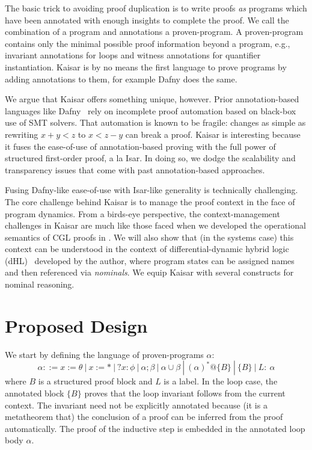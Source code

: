 \documentclass[12pt]{cmuthesis}
\theoremstyle{definition}
\theoremstyle{remark}
\newcommand{\rref}[2][]{\prettyref{#2}}
\newcommand{\dHL}{\textsf{dHL}\xspace}
\newcommand{\CGL}{\textsf{CGL}\xspace}
\begin{document}
The basic trick to avoiding proof duplication is to write proofs \emph{as} programs which have been annotated with enough insights to complete the proof.
We call the combination of a program and annotations a proven-program.
A proven-program contains only the minimal possible proof information beyond a program, e.g., invariant annotations for loops and witness annotations for quantifier instantiation.
Kaisar is by no means the first language to prove programs by adding annotations to them, for example Dafny does the same.

We argue that Kaisar offers something unique, however.
Prior annotation-based languages like Dafny~\cite{DBLP:conf/lpar/Leino10} rely on incomplete proof automation based on black-box use of SMT solvers.
That automation is known to be fragile: changes as simple as rewriting $x + y < z$ to $x < z - y$ can break a proof.
Kaisar is interesting because it fuses the ease-of-use of annotation-based proving with the full power of structured first-order proof, a la Isar.
In doing so, we dodge the scalability and transparency issues that come with past annotation-based approaches.

Fusing Dafny-like ease-of-use with Isar-like generality is technically challenging.
The core challenge behind Kaisar is to manage the proof context in the face of program dynamics.
From a birds-eye perspective, the context-management challenges in Kaisar are much like those faced when we developed the operational semantics of \CGL proofs in \rref{ch:cgl}.
We will also show that (in the systems case) this context can be understood in the context of differential-dynamic hybrid logic (\dHL)~\cite{DBLP:conf/lics/BohrerP18} developed by the author, where program states can be assigned names and then referenced via \emph{nominals}.
We equip Kaisar with several constructs for nominal reasoning.


\section{Proposed Design}
We start by defining the language of proven-programs $\alpha$:
\[\alpha ::= x{:=}\theta\ |\ x{:=}*\ |\ ?x:\phi\ |\ \alpha;\beta\ |\ \alpha\cup\beta\ |\ (\alpha)^*@\{B\}\ |\ \{B\}\ |\ L{:}\ \alpha\]
where $B$ is a structured proof block and $L$ is a label.
In the loop case, the annotated block $\{B\}$ proves that the loop invariant follows from the current context.
The invariant need not be explicitly annotated because (it is a metatheorem that) the conclusion of a proof can be inferred from the proof automatically.
The proof of the inductive step is embedded in the annotated loop body $\alpha$.
\end{document}
